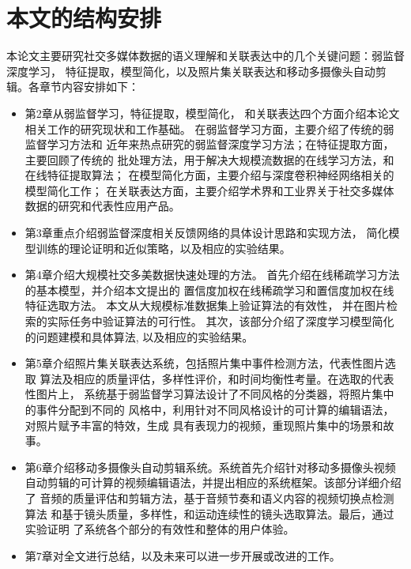 \section{本文的结构安排}
本论文主要研究社交多媒体数据的语义理解和关联表达中的几个关键问题：弱监督深度学习，
特征提取，模型简化，以及照片集关联表达和移动多摄像头自动剪辑。各章节内容安排如下：
\begin{itemize}
    \item 第2章从弱监督学习，特征提取，模型简化，
        和关联表达四个方面介绍本论文相关工作的研究现状和工作基础。
        在弱监督学习方面，主要介绍了传统的弱监督学习方法和
        近年来热点研究的弱监督深度学习方法；在特征提取方面，主要回顾了传统的
        批处理方法，用于解决大规模流数据的在线学习方法，和在线特征提取算法；
        在模型简化方面，主要介绍与深度卷积神经网络相关的模型简化工作；
        在关联表达方面，主要介绍学术界和工业界关于社交多媒体数据的研究和代表性应用产品。
    \item 第3章重点介绍弱监督深度相关反馈网络的具体设计思路和实现方法，
        简化模型训练的理论证明和近似策略，以及相应的实验结果。

    \item 第4章介绍大规模社交多美数据快速处理的方法。
        首先介绍在线稀疏学习方法的基本模型，并介绍本文提出的
        置信度加权在线稀疏学习和置信度加权在线特征选取方法。
        本文从大规模标准数据集上验证算法的有效性，
        并在图片检索的实际任务中验证算法的可行性。
        其次，该部分介绍了深度学习模型简化的问题建模和具体算法,
        以及相应的实验结果。

    \item 第5章介绍照片集关联表达系统，包括照片集中事件检测方法，代表性图片选取
        算法及相应的质量评估，多样性评价，和时间均衡性考量。在选取的代表性图片上，
        系统基于弱监督学习算法设计了不同风格的分类器，将照片集中的事件分配到不同的
        风格中，利用针对不同风格设计的可计算的编辑语法，对照片赋予丰富的特效，生成
        具有表现力的视频，重现照片集中的场景和故事。

    \item 第6章介绍移动多摄像头自动剪辑系统。系统首先介绍针对移动多摄像头视频
        自动剪辑的可计算的视频编辑语法，并提出相应的系统框架。该部分详细介绍了
        音频的质量评估和剪辑方法，基于音频节奏和语义内容的视频切换点检测算法
        和基于镜头质量，多样性，和运动连续性的镜头选取算法。最后，通过实验证明
        了系统各个部分的有效性和整体的用户体验。

    \item 第7章对全文进行总结，以及未来可以进一步开展或改进的工作。
\end{itemize}
